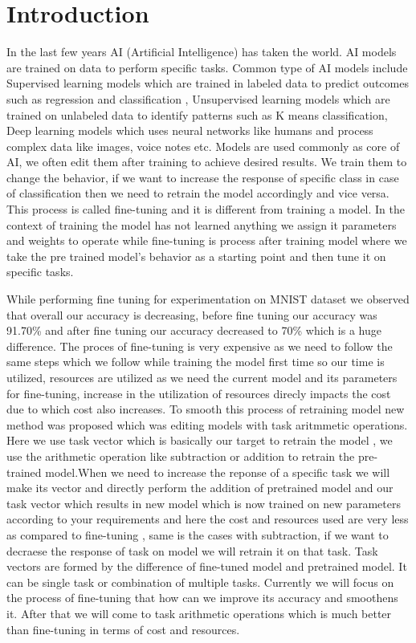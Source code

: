 \documentclass[conference]{IEEEtran}
\begin{document}
\section{Introduction}
In the last few years AI (Artificial Intelligence) has taken the world. AI models are trained on data to perform specific tasks. Common type of AI models include Supervised learning models which are trained in labeled data to predict outcomes such as regression and classification , Unsupervised learning models  which are trained on unlabeled data to identify patterns such as K means classification, Deep learning models which uses neural networks like humans and process complex data like images, voice notes etc. Models are used commonly as core of AI, we often edit them after training to achieve desired results. We train them to change the behavior, if we want to increase the response of specific class in case of classification then we need to retrain the model accordingly and vice versa. This process is called fine-tuning and it is different from training a model. In the context of training the model has not learned anything we assign it parameters and weights to operate while fine-tuning is process after training model where we take the pre trained model’s behavior as a starting point and then tune it on specific tasks. 

While performing fine tuning for experimentation on MNIST dataset we observed that overall our accuracy is decreasing, before fine tuning our accuracy was 91.70\% and after fine tuning our accuracy decreased to 70\% which is a huge difference. The proces of fine-tuning is very expensive as we need to follow the same steps which we follow while training the model first time so our time is utilized, resources are utilized as we need the current model and its parameters for fine-tuning, increase in the utilization of resources direcly impacts the cost due to which cost also increases. To smooth this process of retraining model new method was proposed which was editing models with task aritmmetic operations\cite{paper-1}. Here we use task vector which is basically our target to retrain the model , we use the arithmetic operation like subtraction or addition to retrain the pre-trained model.When we need to increase the reponse of a specific task we will make its vector and directly perform the addition of pretrained model and our task vector which results in new model which is now trained on new parameters according to your requirements and here the cost and resources used are very less as compared to fine-tuning , same is the cases with subtraction, if we want to decraese the response of task on model we will retrain it on that task. Task vectors are formed by the difference of fine-tuned model and pretrained model. It can be single task or combination of multiple tasks. Currently we will focus on the process of fine-tuning that how can we improve its accuracy and smoothens it. After that we will come to task arithmetic operations which is much better than fine-tuning in terms of cost and resources. 
\end{document}

